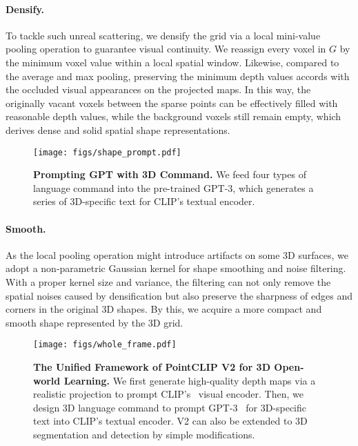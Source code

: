 \documentclass[10pt,twocolumn,letterpaper]{article}
\begin{document}
\vspace{-6pt}
\paragraph{Densify.} 
To tackle such unreal scattering, we densify the grid via a local mini-value pooling operation to guarantee visual continuity. We reassign every voxel in $G$ by the minimum voxel value within a local spatial window. Likewise, compared to the average and max pooling, preserving the minimum depth values accords with the occluded visual appearances on the projected maps. In this way, the originally vacant voxels between the sparse points can be effectively filled with reasonable depth values, while the background voxels still remain empty, which derives dense and solid spatial shape representations.

\label{method:tasks}
\begin{figure}[t!]
\centering
\texttt{[image: figs/shape\_prompt.pdf]}
\vspace{0.15cm}
\caption{\textbf{Prompting GPT with 3D Command.} We feed four types of language command into the pre-trained GPT-3, which generates a series of 3D-specific text for CLIP's textual encoder.}
\label{fig:3d_command}
\vspace{-0.25cm}
\end{figure}

\vspace{-6pt}
\paragraph{Smooth.} 
As the local pooling operation might introduce artifacts on some 3D surfaces, we adopt a non-parametric Gaussian kernel for shape smoothing and noise filtering. With a proper kernel size and variance, the filtering can not only remove the spatial noises caused by densification but also preserve the sharpness of edges and corners in the original 3D shapes. By this, we acquire a more compact and smooth shape represented by the 3D grid.

\begin{figure*}[t!]
\centering
\texttt{[image: figs/whole\_frame.pdf]}
\vspace{0.1cm}
\caption{\textbf{The Unified Framework of PointCLIP V2 for 3D Open-world Learning.}
We first generate high-quality depth maps via a realistic projection to prompt CLIP's~\cite{radford2021learning} visual encoder. Then, we design 3D language command to prompt GPT-3~\cite{brown2020language} for 3D-specific text into CLIP's textual encoder. V2 can also be extended to 3D segmentation and detection by simple modifications.}
\label{fig:framework2}
\vspace{-0.1cm}
\end{figure*}
\end{document}
